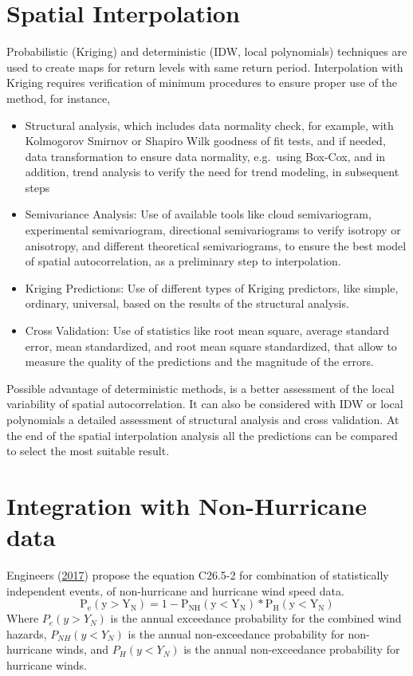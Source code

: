 \documentclass[12pt,oneside]{reedthesis}
\begin{document}
\hypertarget{spatial-interpolation}{%
\section{Spatial Interpolation}\label{spatial-interpolation}}

Probabilistic (Kriging) and deterministic (IDW, local polynomials) techniques are used to create maps for return levels with same return period. Interpolation with Kriging requires verification of minimum procedures to ensure proper use of the method, for instance,
\begin{itemize}
\item
  Structural analysis, which includes data normality check, for example, with Kolmogorov Smirnov or Shapiro Wilk goodness of fit tests, and if needed, data transformation to ensure data normality, e.g.~using Box-Cox, and in addition, trend analysis to verify the need for trend modeling, in subsequent steps
\item
  Semivariance Analysis: Use of available tools like cloud semivariogram, experimental semivariogram, directional semivariograms to verify isotropy or anisotropy, and different theoretical semivariograms, to ensure the best model of spatial autocorrelation, as a preliminary step to interpolation.
\item
  Kriging Predictions: Use of different types of Kriging predictors, like simple, ordinary, universal, based on the results of the structural analysis.
\item
  Cross Validation: Use of statistics like root mean square, average standard error, mean standardized, and root mean square standardized, that allow to measure the quality of the predictions and the magnitude of the errors.
\end{itemize}
Possible advantage of deterministic methods, is a better assessment of the local variability of spatial autocorrelation. It can also be considered with IDW or local polynomials a detailed assessment of structural analysis and cross validation. At the end of the spatial interpolation analysis all the predictions can be compared to select the most suitable result.

\hypertarget{integration-with-non-hurricane-data}{%
\section{Integration with Non-Hurricane data}\label{integration-with-non-hurricane-data}}

Engineers (\protect\hyperlink{ref-Asce2017}{2017}) propose the equation C26.5-2 for combination of statistically independent events, of non-hurricane and hurricane wind speed data.
\begin{equation}
  \mathrm{
          P_e(y>Y_N) = 1 - P_{NH}(y<Y_N)*P_{H}(y<Y_N)
        }
  \label{eq:combination}
\end{equation}
Where \(P_e(y>Y_N)\) is the annual exceedance probability for the combined wind hazards, \(P_{NH}(y<Y_N)\) is the annual non-exceedance probability for non-hurricane winds, and \(P_{H}(y<Y_N)\) is the annual non-exceedance probability for hurricane winds.
\end{document}
